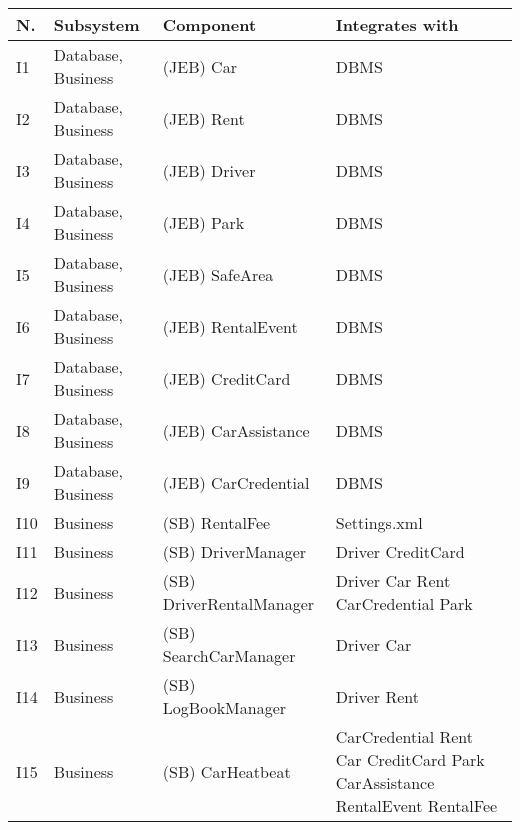 \begin{table}[H]
    \centering
    \begin{small}
    \begin{tabular}{| l | l | p{} | p{} |}
    \hline
    \textbf{N.} & \textbf{Subsystem} & \textbf{Component} & \textbf{Integrates with} \\
    \hline
    I1 & Database, Business & (JEB) Car & DBMS\\
    \hline
    I2 & Database, Business & (JEB) Rent & DBMS\\
    \hline
    I3 & Database, Business & (JEB) Driver & DBMS\\
    \hline
    I4 & Database, Business & (JEB) Park & DBMS\\
   \hline
    I5 & Database, Business & (JEB) SafeArea & DBMS\\
    \hline
    I6 & Database, Business & (JEB) RentalEvent & DBMS\\
    \hline
    I7 & Database, Business & (JEB) CreditCard & DBMS\\
    \hline
     I8 & Database, Business & (JEB) CarAssistance & DBMS\\
    \hline
     I9 & Database, Business & (JEB) CarCredential & DBMS\\
    \hline
     I10 & Business & (SB) RentalFee & Settings.xml \\
    \hline
     I11 & Business & (SB) DriverManager & Driver \newline CreditCard\\
    \hline
     I12 & Business & (SB) DriverRentalManager & Driver \newline Car \newline Rent \newline CarCredential \newline Park\\
    \hline
     I13 & Business & (SB) SearchCarManager & Driver \newline Car\\
    \hline
     I14 & Business & (SB) LogBookManager & Driver \newline Rent  \\
    \hline
     I15 & Business & (SB) CarHeatbeat & CarCredential \newline Rent \newline Car  \newline CreditCard  \newline Park  \newline CarAssistance  \newline RentalEvent  \newline RentalFee  \\

\end{tabular}
\end{small}
\end{table}
